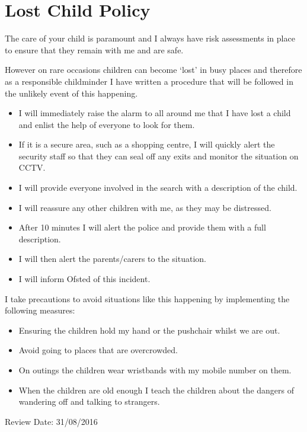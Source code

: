 

\section{Lost Child Policy}

The care of your child is paramount and I always have risk assessments
in place to ensure that they remain with me and are safe.

However on rare occasions children can become `lost' in busy places and
therefore as a responsible childminder I have written a procedure that
will be followed in the unlikely event of this happening.

\begin{itemize}
\item
  I will immediately raise the alarm to all around me that I have lost
  a child and enlist the help of everyone to look for them.
\item
  If it is a secure area, such as a shopping centre, I will quickly
  alert the security staff so that they can seal off any exits and
  monitor the situation on CCTV.
\item
  I will provide everyone involved in the search with a description of
  the child.
\item
  I will reassure any other children with me, as they may be
  distressed.
\item
  After 10 minutes I will alert the police and provide them with a
  full description.
\item
  I will then alert the parents/carers to the situation.
\item
  I will inform Ofsted of this incident.
\end{itemize}

I take precautions to avoid situations like this happening by
implementing the following measures:

\begin{itemize}
\item
  Ensuring the children hold my hand or the pushchair whilst we are
  out.
\item
  Avoid going to places that are overcrowded.
\item
  On outings the children wear wristbands with my mobile number on
  them.
\item
  When the children are old enough I teach the children about the
  dangers of wandering off and talking to strangers.
\end{itemize}

Review Date: 31/08/2016


